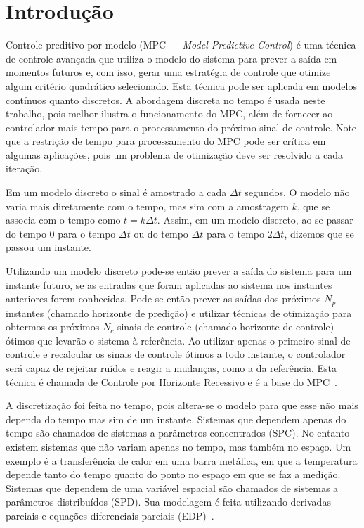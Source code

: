 
\chapter{Introdução}%
\label{chp:introducao}

Controle preditivo por modelo (\ac{MPC} --- \textit{Model Predictive Control}) é
uma técnica de controle avançada que utiliza o modelo do sistema para prever a
saída em momentos futuros e, com isso, gerar uma estratégia de controle que
otimize algum critério quadrático selecionado. Esta técnica pode ser aplicada em
modelos contínuos quanto discretos. A abordagem discreta no tempo é usada neste
trabalho, pois melhor ilustra o funcionamento do \ac{MPC}, além de fornecer ao
controlador mais tempo para o processamento do próximo sinal de controle. Note
que a restrição de tempo para processamento do MPC pode ser crítica em algumas
aplicações, pois um problema de otimização deve ser resolvido a cada iteração.

Em um modelo discreto o sinal é amostrado a cada \( \Delta{}t \) segundos. O
modelo não varia mais diretamente com o tempo, mas sim com a amostragem \( k \),
que se associa com o tempo como \( t = k\Delta{}t \). Assim, em um modelo
discreto, ao se passar do tempo \( 0 \) para o tempo \(\Delta{}t \) ou do tempo
\( \Delta{}t \) para o tempo \( 2\Delta{}t \), dizemos que se passou um
instante.

Utilizando um modelo discreto pode-se então prever a saída do sistema para um
instante futuro, se as entradas que foram aplicadas ao sistema nos instantes
anteriores forem conhecidas. Pode-se então prever as saídas dos próximos \(N_p\)
instantes (chamado horizonte de predição) e utilizar técnicas de otimização para
obtermos os próximos \(N_c\) sinais de controle (chamado horizonte de controle)
ótimos que levarão o sistema à referência. Ao utilizar apenas o primeiro sinal
de controle e recalcular os sinais de controle ótimos a todo instante, o
controlador será capaz de rejeitar ruídos e reagir a mudanças, como a da
referência. Esta técnica é chamada de Controle por Horizonte Recessivo e é a
base do \ac{MPC}~\cite{book:wang}.

A discretização foi feita no tempo, pois altera-se o modelo para que esse não
mais dependa do tempo mas sim de um instante. Sistemas que dependem apenas do
tempo são chamados de sistemas a parâmetros concentrados (\ac{SPC}). No entanto
existem sistemas que não variam apenas no tempo, mas também no espaço. Um
exemplo é a transferência de calor em uma barra metálica, em que a temperatura
depende tanto do tempo quanto do ponto no espaço em que se faz a medição.
Sistemas que dependem de uma variável espacial são chamados de sistemas a
parâmetros distribuídos (\ac{SPD}). Sua modelagem é feita utilizando derivadas
parciais e equações diferenciais parciais (\ac{EDP})~\cite{phdthesis:caldeira}.

